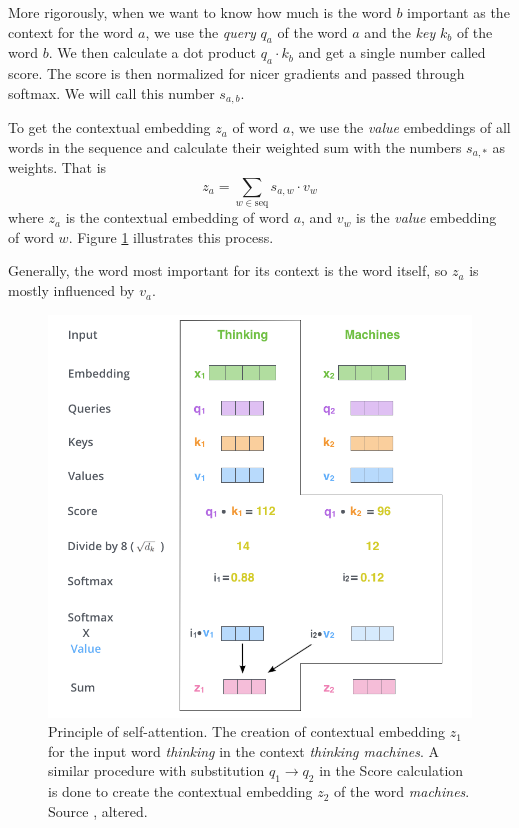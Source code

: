 \documentclass[
  printed, %
  color,   %
  table,   %
  oneside, %
  lof,     %
  lot,     %
]{fithesis3}
\begin{document}
More rigorously, when we want to know how much is the word $b$ important as the context for the word $a$, we use the \textit{query}  $q_a$ of the word $a$ and the \textit{key} $k_b$ of the word $b$. We then calculate a dot product $q_a \cdot k_b$ and get a single number called score. The score is then normalized for nicer gradients and passed through softmax. We will call this number $s_{a,b}$.

To get the contextual embedding $z_a$ of word $a$, we use the \textit{value} embeddings of all words in the sequence and calculate their weighted sum with the numbers $s_{a,*}$ as weights. That is
$$
z_a = \sum_{w  \in  \text{seq}} s_{a,w} \cdot v_w
$$
where $z_a$ is the contextual embedding of word $a$, and $v_w$ is the \textit{value} embedding of word $w$. Figure \ref{fig:selfatt} illustrates this process.

Generally, the word most important for its context is the word itself, so $z_a$ is mostly influenced by $v_a$. 

\begin{figure}[t!]
    \includegraphics[width=\linewidth]{img/self-attention-output-altered.png}
  \caption[Principle of self-attention]{Principle of self-attention. The creation of contextual embedding $z_1$ for the input word \textit{thinking} in the context \textit{thinking machines}. A similar procedure with substitution $q_1 \rightarrow q_2$ in the Score calculation is done to create the contextual embedding $z_2$ of the word \textit{machines}.  Source \parencite{ilustrtran}, altered. }
  \label{fig:selfatt}
\end{figure}
\end{document}
